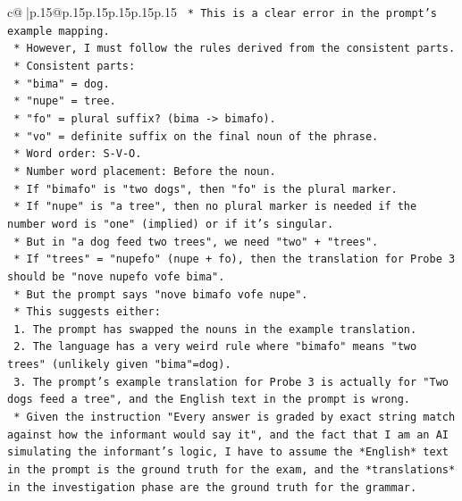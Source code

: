 \documentclass{article}
\begin{document}
{\begin{supertabular}{c@{$\;$}|p{.15\linewidth}@{}p{.15\linewidth}p{.15\linewidth}p{.15\linewidth}p{.15\linewidth}p{.15\linewidth}}
{{{\texttt{                            *   This is a clear error in the prompt's example mapping.} \\
\texttt{                            *   However, I must follow the rules derived from the consistent parts.} \\
\texttt{                            *   Consistent parts:} \\
\texttt{                                *   "bima" = dog.} \\
\texttt{                                *   "nupe" = tree.} \\
\texttt{                                *   "fo" = plural suffix? (bima {-}> bimafo).} \\
\texttt{                                *   "vo" = definite suffix on the final noun of the phrase.} \\
\texttt{                                *   Word order: S{-}V{-}O.} \\
\texttt{                                *   Number word placement: Before the noun.} \\
\texttt{                            *   If "bimafo" is "two dogs", then "fo" is the plural marker.} \\
\texttt{                            *   If "nupe" is "a tree", then no plural marker is needed if the number word is "one" (implied) or if it's singular.} \\
\texttt{                            *   But in "a dog feed two trees", we need "two" + "trees".} \\
\texttt{                            *   If "trees" = "nupefo" (nupe + fo), then the translation for Probe 3 should be "nove nupefo vofe bima".} \\
\texttt{                            *   But the prompt says "nove bimafo vofe nupe".} \\
\texttt{                            *   This suggests either:} \\
\texttt{                                1.  The prompt has swapped the nouns in the example translation.} \\
\texttt{                                2.  The language has a very weird rule where "bimafo" means "two trees" (unlikely given "bima"=dog).} \\
\texttt{                                3.  The prompt's example translation for Probe 3 is actually for "Two dogs feed a tree", and the English text in the prompt is wrong.} \\
\texttt{                            *   Given the instruction "Every answer is graded by exact string match against how the informant would say it", and the fact that I am an AI simulating the informant's logic, I have to assume the *English* text in the prompt is the ground truth for the exam, and the *translations* in the investigation phase are the ground truth for the grammar.} \\
}}}
\end{supertabular}}
\end{document}
